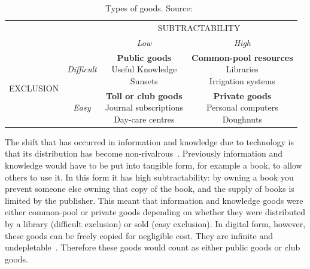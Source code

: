 \begin{table}
\centering
\caption[Types of goods]{Types of goods. Source:~\protect\citet{Hess2007}\label{table:goods}}
\begin{tabular}{cccc}
\multicolumn{2}{c}{} & \multicolumn{2}{c}{SUBTRACTABILITY} \\
\multicolumn{2}{c}{} & \textit{Low} & \textit{High} \\
\hline
\multirow{2}{*}{\begin{sideways}EXCLUSION\end{sideways}} & \textit{Difficult} & \parbox{4cm}{\vspace{.3\baselineskip}\textbf{Public goods}\\
Useful Knowledge\\
Sunsets} & \parbox{4.5cm}{\vspace{.3\baselineskip}\textbf{Common-pool resources}\\
Libraries\\
Irrigation systems} \\[0.6cm]
 & \textit{Easy} & \parbox{4cm}{\vspace{.3\baselineskip}\textbf{Toll or club goods}\\
 Journal subscriptions\\
 Day-care centres} & \parbox{4.5cm}{\vspace{.3\baselineskip}\textbf{Private goods}\\
 Personal computers\\
 Doughnuts} \\[0.7cm]
\end{tabular}
\end{table}

The shift that has occurred in information and knowledge due to technology is that its distribution has become non-rivalrous~\citep{Ostrom2003,Bollier2007}.
Previously information and knowledge would have to be put into tangible form, for example a book, to allow others to use it. 
In this form it has high subtractability: by owning a book you prevent someone else owning that copy of the book, and the supply of books is limited by the publisher. 
This meant that information and knowledge goods were either common-pool or private goods depending on whether they were distributed by a library (difficult exclusion) or sold (easy exclusion). 
In digital form, however, these goods can be freely copied for negligible cost. 
They are infinite and undepletable~\citep{Bollier2007}. 
Therefore these goods would count as either public goods or club goods.

